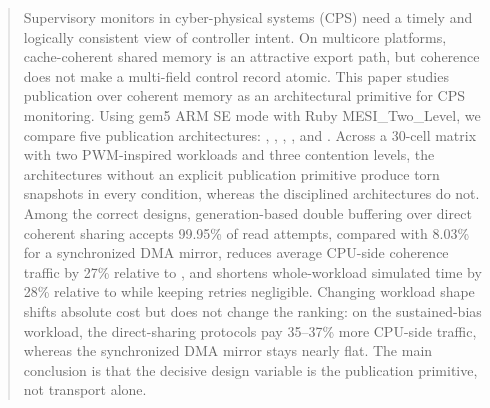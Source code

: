 \begin{abstract}
Supervisory monitors in cyber-physical systems (CPS) need a timely and
logically consistent view of controller intent. On multicore platforms,
cache-coherent shared memory is an attractive export path, but
coherence does not make a multi-field control record atomic. This paper
studies publication over coherent memory as an architectural primitive
for CPS monitoring. Using gem5 ARM SE mode with Ruby
MESI\_Two\_Level, we compare five publication architectures:
\unsync, \seqlock, \dblbuf, \dmanaive, and \dmaseqlock. Across a
30-cell matrix with two PWM-inspired workloads and three contention
levels, the architectures without an explicit publication primitive
produce torn snapshots in every condition, whereas the disciplined
architectures do not. Among the correct designs, generation-based double
buffering over direct coherent sharing accepts 99.95\% of read attempts,
compared with 8.03\% for a synchronized DMA mirror, reduces average
CPU-side coherence traffic by 27\% relative to \seqlock, and shortens
whole-workload simulated time by 28\% relative to \dmaseqlock while
keeping retries negligible. Changing workload shape shifts absolute cost
but does not change the ranking: on the sustained-bias workload, the
direct-sharing protocols pay 35--37\% more CPU-side traffic, whereas
the synchronized DMA mirror stays nearly flat. The main conclusion is
that the decisive design variable is the publication primitive, not
transport alone.
\end{abstract}
